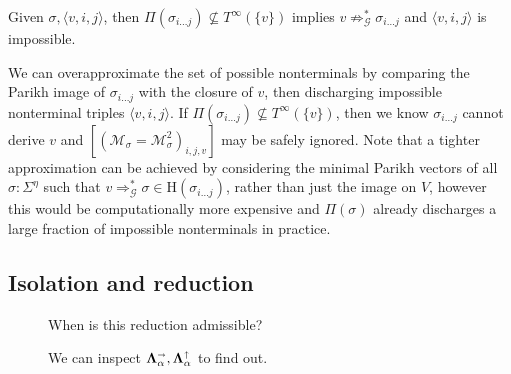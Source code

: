 \documentclass[sigplan,review,anonymous,acmsmall]{acmart}\settopmatter{printfolios=false,printccs=false,printacmref=false}
\begin{document}
\begin{lemma}
Given $\sigma, \langle v, i, j \rangle$, then $\Pi(\sigma_{i\ldots j}) \not\subseteq T^\infty(\{v\})$ implies $v\not\Rightarrow^*_\mathcal{G} \sigma_{i\ldots j}$ and $\langle v, i, j \rangle$ is impossible.
\end{lemma}

We can overapproximate the set of possible nonterminals by comparing the Parikh image of $\sigma_{i\ldots j}$ with the closure of $v$, then discharging impossible nonterminal triples $\langle v, i, j \rangle$. If $\Pi(\sigma_{i\ldots j}) \not\subseteq T^\infty(\{v\})$, then we know $\sigma_{i\ldots j}$ cannot derive $v$ and $\left[(\mathcal{M}_{\sigma} = \mathcal{M}_{\sigma}^2)_{i, j, v}\right]$ may be safely ignored. Note that a tighter approximation can be achieved by considering the minimal Parikh vectors of all $\sigma: \Sigma^\eta$ such that $v \Rightarrow_\mathcal{G}^* \sigma \in \text{H}(\sigma_{i\ldots j})$, rather than just the image on $V$, however this would be computationally more expensive and $\Pi(\sigma)$ already discharges a large fraction of impossible nonterminals in practice.

\subsection{Isolation and reduction}

\newcommand\ddd{\Ddots}
\newcommand\vdd{\Vdots}
\newcommand\cdd{\Cdots}
\newcommand\lds{\ldots}
\newcommand\vno{\varnothing}
\newcommand{\ts}[1]{\textsuperscript{#1}}
\newcommand\non{1\ts{st}}
\newcommand\ntw{2\ts{nd}}
\newcommand\nth{3\ts{rd}}
\newcommand\nfo{4\ts{th}}
\newcommand\nfi{5\ts{th}}
\newcommand\nsi{6\ts{th}}
\newcommand\nse{7\ts{th}}
\newcommand{\vs}[1]{\sigma_{#1}^{\shur}}
\newcommand{\gs}[1]{\gamma_{#1}^{\shur}}
\newcommand{\bs}[1]{\beta_{#1}^{\shur}}
\newcommand{\qs}[1]{\alpha_{#1}^{\shur}}
\newcommand\rcr{\rowcolor{black!15}}
\newcommand\rcw{\rowcolor{white}}
\newcommand\pcd{\cdot}
\newcommand\pcp{\phantom\cdot}
\newcommand\ppp{\phantom{\nse}}
\newcommand\hhg[1]{\tikz[overlay]\node[rectangle,fill=black!15,draw=none,text opacity =1] {$#1$};}

\begin{figure}
  \vspace{-20pt}
  \resizebox{0.4\textwidth}{!}{}
  \caption{When is this reduction admissible?}\label{fig:mat_simpl}
  \begin{center}\resizebox{0.35\textwidth}{!}{}\end{center}
  \caption{We can inspect $\bm\Lambda_\alpha^\shortrightarrow, \bm\Lambda_\alpha^\shortuparrow$ to find out.}
\end{figure}
\end{document}
